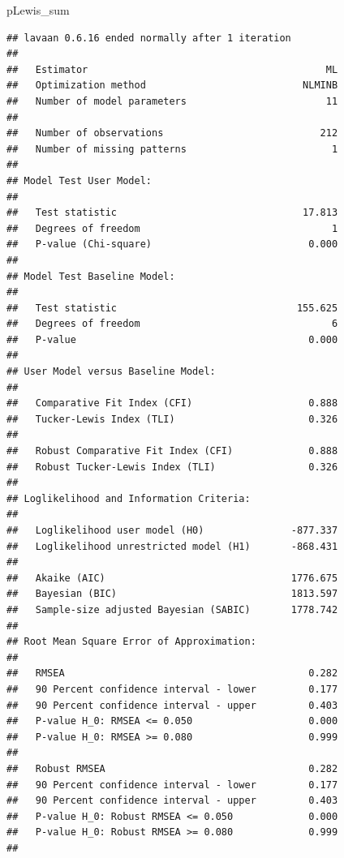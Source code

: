\documentclass[
  11pt,
]{book}
\newenvironment{Shaded}{\begin{snugshade}}{\end{snugshade}}
\newcommand{\NormalTok}[1]{#1}
\begin{document}
\begin{Shaded}
\begin{Highlighting}[]
\NormalTok{pLewis\_sum}
\end{Highlighting}
\end{Shaded}

\begin{verbatim}
## lavaan 0.6.16 ended normally after 1 iteration
## 
##   Estimator                                         ML
##   Optimization method                           NLMINB
##   Number of model parameters                        11
## 
##   Number of observations                           212
##   Number of missing patterns                         1
## 
## Model Test User Model:
##                                                       
##   Test statistic                                17.813
##   Degrees of freedom                                 1
##   P-value (Chi-square)                           0.000
## 
## Model Test Baseline Model:
## 
##   Test statistic                               155.625
##   Degrees of freedom                                 6
##   P-value                                        0.000
## 
## User Model versus Baseline Model:
## 
##   Comparative Fit Index (CFI)                    0.888
##   Tucker-Lewis Index (TLI)                       0.326
##                                                       
##   Robust Comparative Fit Index (CFI)             0.888
##   Robust Tucker-Lewis Index (TLI)                0.326
## 
## Loglikelihood and Information Criteria:
## 
##   Loglikelihood user model (H0)               -877.337
##   Loglikelihood unrestricted model (H1)       -868.431
##                                                       
##   Akaike (AIC)                                1776.675
##   Bayesian (BIC)                              1813.597
##   Sample-size adjusted Bayesian (SABIC)       1778.742
## 
## Root Mean Square Error of Approximation:
## 
##   RMSEA                                          0.282
##   90 Percent confidence interval - lower         0.177
##   90 Percent confidence interval - upper         0.403
##   P-value H_0: RMSEA <= 0.050                    0.000
##   P-value H_0: RMSEA >= 0.080                    0.999
##                                                       
##   Robust RMSEA                                   0.282
##   90 Percent confidence interval - lower         0.177
##   90 Percent confidence interval - upper         0.403
##   P-value H_0: Robust RMSEA <= 0.050             0.000
##   P-value H_0: Robust RMSEA >= 0.080             0.999
## 

\end{verbatim}
\end{document}
